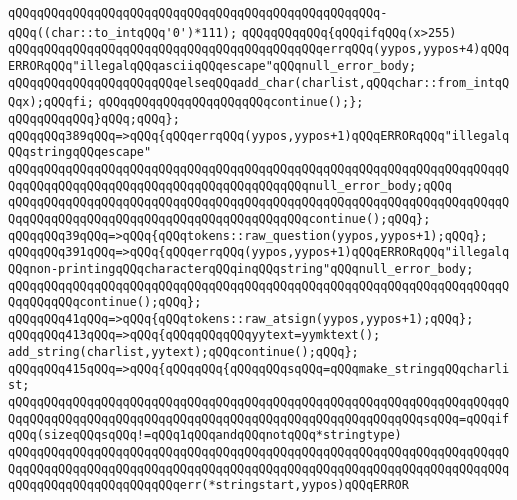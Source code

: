 \verb|qQQqqQQqqQQqqQQqqQQqqQQqqQQqqQQqqQQqqQQqqQQqqQQqqQQq-qQQq((char::to_intqQQq'0')*111);|\newline
\verb|qQQqqQQqqQQq{qQQqifqQQq(x>255)|\newline
\verb|qQQqqQQqqQQqqQQqqQQqqQQqqQQqqQQqqQQqqQQqqQQqerrqQQq(yypos,yypos+4)qQQqERRORqQQq"illegalqQQqasciiqQQqescape"qQQqnull_error_body;|\newline
\verb|qQQqqQQqqQQqqQQqqQQqqQQqelseqQQqadd_char(charlist,qQQqchar::from_intqQQqx);qQQqfi;|\newline
\verb|qQQqqQQqqQQqqQQqqQQqqQQqcontinue();};|\newline
\verb|qQQqqQQqqQQq}qQQq;qQQq};|\newline
\verb|qQQqqQQq389qQQq=>qQQq{qQQqerrqQQq(yypos,yypos+1)qQQqERRORqQQq"illegalqQQqstringqQQqescape"|\newline
\verb|qQQqqQQqqQQqqQQqqQQqqQQqqQQqqQQqqQQqqQQqqQQqqQQqqQQqqQQqqQQqqQQqqQQqqQQqqQQqqQQqqQQqqQQqqQQqqQQqqQQqqQQqqQQqqQQqnull_error_body;qQQq|\newline
\verb|qQQqqQQqqQQqqQQqqQQqqQQqqQQqqQQqqQQqqQQqqQQqqQQqqQQqqQQqqQQqqQQqqQQqqQQqqQQqqQQqqQQqqQQqqQQqqQQqqQQqqQQqqQQqqQQqcontinue();qQQq};|\newline
\verb|qQQqqQQq39qQQq=>qQQq{qQQqtokens::raw_question(yypos,yypos+1);qQQq};|\newline
\verb|qQQqqQQq391qQQq=>qQQq{qQQqerrqQQq(yypos,yypos+1)qQQqERRORqQQq"illegalqQQqnon-printingqQQqcharacterqQQqinqQQqstring"qQQqnull_error_body;|\newline
\verb|qQQqqQQqqQQqqQQqqQQqqQQqqQQqqQQqqQQqqQQqqQQqqQQqqQQqqQQqqQQqqQQqqQQqqQQqqQQqqQQqcontinue();qQQq};|\newline
\verb|qQQqqQQq41qQQq=>qQQq{qQQqtokens::raw_atsign(yypos,yypos+1);qQQq};|\newline
\verb|qQQqqQQq413qQQq=>qQQq{qQQqqQQqqQQqyytext=yymktext();|\newline
\verb|add_string(charlist,yytext);qQQqcontinue();qQQq};|\newline
\verb|qQQqqQQq415qQQq=>qQQq{qQQqqQQq{qQQqqQQqsqQQq=qQQqmake_stringqQQqcharlist;|\newline
\verb|qQQqqQQqqQQqqQQqqQQqqQQqqQQqqQQqqQQqqQQqqQQqqQQqqQQqqQQqqQQqqQQqqQQqqQQqqQQqqQQqqQQqqQQqqQQqqQQqqQQqqQQqqQQqqQQqqQQqqQQqqQQqqQQqsqQQq=qQQqifqQQq(sizeqQQqsqQQq!=qQQq1qQQqandqQQqnotqQQq*stringtype)|\newline
\verb|qQQqqQQqqQQqqQQqqQQqqQQqqQQqqQQqqQQqqQQqqQQqqQQqqQQqqQQqqQQqqQQqqQQqqQQqqQQqqQQqqQQqqQQqqQQqqQQqqQQqqQQqqQQqqQQqqQQqqQQqqQQqqQQqqQQqqQQqqQQqqQQqqQQqqQQqqQQqqQQqqQQqerr(*stringstart,yypos)qQQqERROR|\newline
